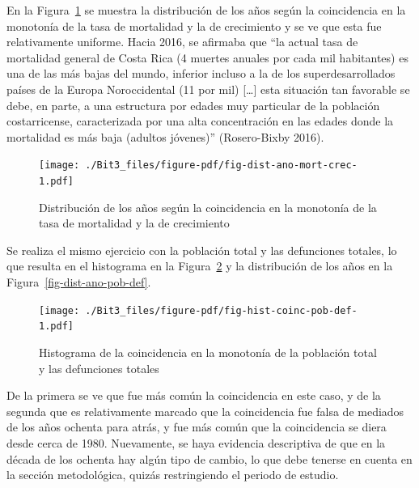 \documentclass[
  letterpaper,
  onepage,
  openany]{report}
\begin{document}
En la Figura~\ref{fig-dist-ano-mort-crec} se muestra la distribución de
los años según la coincidencia en la monotonía de la tasa de mortalidad
y la de crecimiento y se ve que esta fue relativamente uniforme. Hacia
2016, se afirmaba que ``la actual tasa de mortalidad general de Costa
Rica (4 muertes anuales por cada mil habitantes) es una de las más bajas
del mundo, inferior incluso a la de los superdesarrollados países de la
Europa Noroccidental (11 por mil) {[}\ldots{]} esta situación tan
favorable se debe, en parte, a una estructura por edades muy particular
de la población costarricense, caracterizada por una alta concentración
en las edades donde la mortalidad es más baja (adultos jóvenes)''
(Rosero-Bixby 2016).

\begin{figure}[H]

{\centering \texttt{[image: ./Bit3\_files/figure-pdf/fig-dist-ano-mort-crec-1.pdf]}

}

\caption{\label{fig-dist-ano-mort-crec}Distribución de los años según la
coincidencia en la monotonía de la tasa de mortalidad y la de
crecimiento}

\end{figure}

Se realiza el mismo ejercicio con la población total y las defunciones
totales, lo que resulta en el histograma en la
Figura~\ref{fig-hist-coinc-pob-def} y la distribución de los años en la
Figura~\ref{fig-dist-ano-pob-def}.

\begin{figure}[H]

{\centering \texttt{[image: ./Bit3\_files/figure-pdf/fig-hist-coinc-pob-def-1.pdf]}

}

\caption{\label{fig-hist-coinc-pob-def}Histograma de la coincidencia en
la monotonía de la población total y las defunciones totales}

\end{figure}

De la primera se ve que fue más común la coincidencia en este caso, y de
la segunda que es relativamente marcado que la coincidencia fue falsa de
mediados de los años ochenta para atrás, y fue más común que la
coincidencia se diera desde cerca de 1980. Nuevamente, se haya evidencia
descriptiva de que en la década de los ochenta hay algún tipo de cambio,
lo que debe tenerse en cuenta en la sección metodológica, quizás
restringiendo el periodo de estudio.
\end{document}
